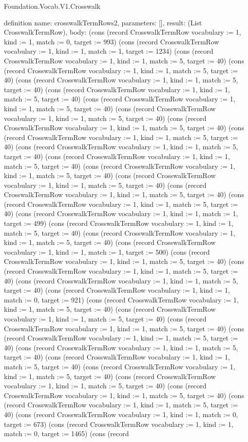 \begin{lexlean}{Foundation.Vocab.V1.Crosswalk}
\begin{semanticmodule}
definition{
  name: crosswalkTermRows2,
  parameters: [],
  result: (List CrosswalkTermRow),
  body: (cons (record CrosswalkTermRow {vocabulary := 1, kind := 1, match := 0, target := 993}) (cons (record CrosswalkTermRow {vocabulary := 1, kind := 1, match := 1, target := 1234}) (cons (record CrosswalkTermRow {vocabulary := 1, kind := 1, match := 5, target := 40}) (cons (record CrosswalkTermRow {vocabulary := 1, kind := 1, match := 5, target := 40}) (cons (record CrosswalkTermRow {vocabulary := 1, kind := 1, match := 5, target := 40}) (cons (record CrosswalkTermRow {vocabulary := 1, kind := 1, match := 5, target := 40}) (cons (record CrosswalkTermRow {vocabulary := 1, kind := 1, match := 5, target := 40}) (cons (record CrosswalkTermRow {vocabulary := 1, kind := 1, match := 5, target := 40}) (cons (record CrosswalkTermRow {vocabulary := 1, kind := 1, match := 5, target := 40}) (cons (record CrosswalkTermRow {vocabulary := 1, kind := 1, match := 5, target := 40}) (cons (record CrosswalkTermRow {vocabulary := 1, kind := 1, match := 5, target := 40}) (cons (record CrosswalkTermRow {vocabulary := 1, kind := 1, match := 5, target := 40}) (cons (record CrosswalkTermRow {vocabulary := 1, kind := 1, match := 5, target := 40}) (cons (record CrosswalkTermRow {vocabulary := 1, kind := 1, match := 5, target := 40}) (cons (record CrosswalkTermRow {vocabulary := 1, kind := 1, match := 5, target := 40}) (cons (record CrosswalkTermRow {vocabulary := 1, kind := 1, match := 5, target := 40}) (cons (record CrosswalkTermRow {vocabulary := 1, kind := 1, match := 1, target := 499}) (cons (record CrosswalkTermRow {vocabulary := 1, kind := 1, match := 5, target := 40}) (cons (record CrosswalkTermRow {vocabulary := 1, kind := 1, match := 5, target := 40}) (cons (record CrosswalkTermRow {vocabulary := 1, kind := 1, match := 1, target := 500}) (cons (record CrosswalkTermRow {vocabulary := 1, kind := 1, match := 5, target := 40}) (cons (record CrosswalkTermRow {vocabulary := 1, kind := 1, match := 5, target := 40}) (cons (record CrosswalkTermRow {vocabulary := 1, kind := 1, match := 5, target := 40}) (cons (record CrosswalkTermRow {vocabulary := 1, kind := 1, match := 0, target := 921}) (cons (record CrosswalkTermRow {vocabulary := 1, kind := 1, match := 5, target := 40}) (cons (record CrosswalkTermRow {vocabulary := 1, kind := 1, match := 5, target := 40}) (cons (record CrosswalkTermRow {vocabulary := 1, kind := 1, match := 5, target := 40}) (cons (record CrosswalkTermRow {vocabulary := 1, kind := 1, match := 5, target := 40}) (cons (record CrosswalkTermRow {vocabulary := 1, kind := 1, match := 5, target := 40}) (cons (record CrosswalkTermRow {vocabulary := 1, kind := 1, match := 5, target := 40}) (cons (record CrosswalkTermRow {vocabulary := 1, kind := 1, match := 5, target := 40}) (cons (record CrosswalkTermRow {vocabulary := 1, kind := 1, match := 5, target := 40}) (cons (record CrosswalkTermRow {vocabulary := 1, kind := 1, match := 5, target := 40}) (cons (record CrosswalkTermRow {vocabulary := 1, kind := 1, match := 5, target := 40}) (cons (record CrosswalkTermRow {vocabulary := 1, kind := 1, match := 0, target := 673}) (cons (record CrosswalkTermRow {vocabulary := 1, kind := 1, match := 0, target := 1465}) (cons (record }
\end{semanticmodule}
\end{lexlean}

